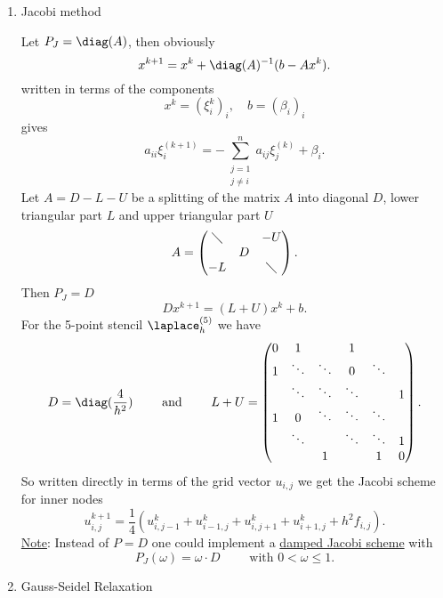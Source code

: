 \begin{enumerate}[label=\Alph{enumi})]
	\item Jacobi method 

		Let $P_{J} = \diag(A)$, then obviously
		\[
			x^{k+1} = x^{k} + \diag(A)^{-1}(b-Ax^{k})
		.\] 
		written in terms of the components
		\[
			x^{k}= (\xi _{i}^{k})_{i}, \quad b=(\beta_{i})_{i}
		\] 
		gives
		\[
			a_{ii}\xi _{i}^{(k+1)} = -\sum_{\substack{j=1 \\ j \neq i}}^{n}{a_{ij}\xi _{j}^{(k)}+ \beta_{i}}
		.\] 
		Let $A=D-L-U$ be a splitting of the matrix $A$ into diagonal $D$, lower triangular part $L$ and upper triangular part $U$
		\[
		A = \begin{pmatrix}
			\diagdown & & -U \\
			  &D&    \\
			-L & & \diagdown
		\end{pmatrix}
		.\] 
		Then $P_{J} = D$
		\[
			Dx^{k+1} = (L+U)x^{k} + b
		.\] 
		For the 5-point stencil $\laplace_{h}^{(5)}$ we have 
		\[
			D = \diag(\frac{4}{h^{2}}) \qquad \text{ and } \qquad L+U = \begin{pmatrix}
				0 & 1 &  & 1 & & \\
				1 & \ddots & \ddots & 0 & \ddots &  \\
				  & \ddots & \ddots & \ddots & & 1 \\
				1 & 0 & \ddots & \ddots & \ddots & \\
				  &\ddots & & \ddots & \ddots & 1 \\
				  && 1 && 1 & 0
			\end{pmatrix}
		.\] 
		So written directly in terms of the grid vector $u_{i,j}$ we get the Jacobi scheme for inner nodes
		\[
			u_{i,j}^{k+1} = \frac{1}{4}(u_{i,j-1}^{k}+ u_{i-1,j}^{k} + u_{i,j+1}^{k} + u_{i+1,j}^{k} + h^{2}f_{i,j})
		.\] 
		\underline{Note}: Instead of $P=D$ one could implement a \underline{damped Jacobi scheme} with
		\[
			P_{J}(\omega )=\omega \cdot D \qquad \text{ with } 0 < \omega \leq 1
		.\] 
	\item Gauss-Seidel Relaxation


\end{enumerate}
